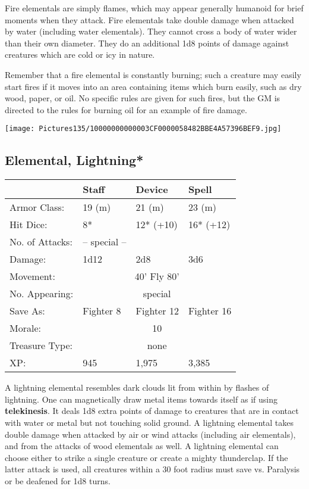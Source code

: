 \documentclass[a4paper,twoside,openany,10pt]{book}
\begin{document}
\begin{multicols}{2}
Fire elementals are simply flames, which may appear generally humanoid for brief moments when they attack. Fire elementals take double damage when attacked by water (including water elementals). They cannot cross a body of water wider than their own diameter. They do an additional 1d8 points of damage against creatures which are cold or icy in nature.

Remember that a fire elemental is constantly burning; such a creature may easily start fires if it moves into an area containing items which burn easily, such as dry wood, paper, or oil. No specific rules are given for such fires, but the GM is directed to the rules for burning oil for an example of fire damage.

\begin{center}
	\texttt{[image: Pictures135/10000000000003CF0000058482BBE4A57396BEF9.jpg]}
\end{center}

\subsection*{Elemental, Lightning*}\label{elemental-lightning}

\begin{tabularx}{0.48\textwidth}{@{}lllX@{}}
& Staff & Device & Spell \\\hline
Armor Class: & 19 (m) & 21 (m) & 23 (m) \\\hline
Hit Dice: & 8* & 12* (+10) & 16* (+12) \\\hline
No. of Attacks: & -- special -- & & \\\hline
Damage: & 1d12 & 2d8 & 3d6 \\\hline
Movement:  & \multicolumn{3}{c}{40' Fly 80'}\\\hline 
No. Appearing: &\multicolumn{3}{c}{special} \\\hline
Save As: & Fighter 8 & Fighter 12 & Fighter 16 \\\hline
Morale: & \multicolumn{3}{c}{10} \\\hline
Treasure Type: & \multicolumn{3}{c}{none} \\\hline
XP: & 945 & 1,975 & 3,385 \\\hline
\end{tabularx}\medskip

A lightning elemental resembles dark clouds lit from within by flashes of lightning. One can magnetically draw metal items towards itself as if using \textbf{telekinesis}. It deals 1d8 extra points of damage to creatures that are in contact with water or metal but not touching solid ground. A lightning elemental takes double damage when attacked by air or wind attacks (including air elementals), and from the attacks of wood elementals as well. A lightning elemental can choose either to strike a single creature or create a mighty thunderclap. If the latter attack is used, all creatures within a 30 foot radius must save vs. Paralysis or be deafened for 1d8 turns.



\end{multicols}
\end{document}
